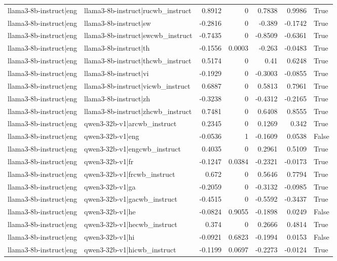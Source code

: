 \begin{table}
\begin{tabular}{l l r r r r l}
llama3-8b-instruct|eng & llama3-8b-instruct|rucwb_instruct & 0.8912 & 0 & 0.7838 & 0.9986 & True \\
llama3-8b-instruct|eng & llama3-8b-instruct|sw & -0.2816 & 0 & -0.389 & -0.1742 & True \\
llama3-8b-instruct|eng & llama3-8b-instruct|swcwb_instruct & -0.7435 & 0 & -0.8509 & -0.6361 & True \\
llama3-8b-instruct|eng & llama3-8b-instruct|th & -0.1556 & 0.0003 & -0.263 & -0.0483 & True \\
llama3-8b-instruct|eng & llama3-8b-instruct|thcwb_instruct & 0.5174 & 0 & 0.41 & 0.6248 & True \\
llama3-8b-instruct|eng & llama3-8b-instruct|vi & -0.1929 & 0 & -0.3003 & -0.0855 & True \\
llama3-8b-instruct|eng & llama3-8b-instruct|vicwb_instruct & 0.6887 & 0 & 0.5813 & 0.7961 & True \\
llama3-8b-instruct|eng & llama3-8b-instruct|zh & -0.3238 & 0 & -0.4312 & -0.2165 & True \\
llama3-8b-instruct|eng & llama3-8b-instruct|zhcwb_instruct & 0.7481 & 0 & 0.6408 & 0.8555 & True \\
llama3-8b-instruct|eng & qwen3-32b-v1|arcwb_instruct & 0.2345 & 0 & 0.1269 & 0.342 & True \\
llama3-8b-instruct|eng & qwen3-32b-v1|eng & -0.0536 & 1 & -0.1609 & 0.0538 & False \\
llama3-8b-instruct|eng & qwen3-32b-v1|engcwb_instruct & 0.4035 & 0 & 0.2961 & 0.5109 & True \\
llama3-8b-instruct|eng & qwen3-32b-v1|fr & -0.1247 & 0.0384 & -0.2321 & -0.0173 & True \\
llama3-8b-instruct|eng & qwen3-32b-v1|frcwb_instruct & 0.672 & 0 & 0.5646 & 0.7794 & True \\
llama3-8b-instruct|eng & qwen3-32b-v1|ga & -0.2059 & 0 & -0.3132 & -0.0985 & True \\
llama3-8b-instruct|eng & qwen3-32b-v1|gacwb_instruct & -0.4515 & 0 & -0.5592 & -0.3437 & True \\
llama3-8b-instruct|eng & qwen3-32b-v1|he & -0.0824 & 0.9055 & -0.1898 & 0.0249 & False \\
llama3-8b-instruct|eng & qwen3-32b-v1|hecwb_instruct & 0.374 & 0 & 0.2666 & 0.4814 & True \\
llama3-8b-instruct|eng & qwen3-32b-v1|hi & -0.0921 & 0.6823 & -0.1994 & 0.0153 & False \\
llama3-8b-instruct|eng & qwen3-32b-v1|hicwb_instruct & -0.1199 & 0.0697 & -0.2273 & -0.0124 & True \\

\end{tabular}
\end{table}
